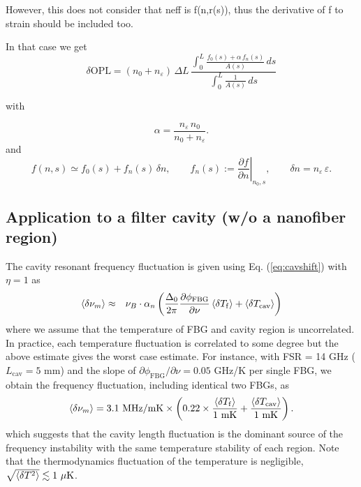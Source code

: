 \documentclass[aps,pra, onecolumn,superscriptaddress,nopacs,floatfix, showkeys, notitlepage]{revtex4-1}
\begin{document}
However, this does not consider that neff is f(n,r(s)), thus the derivative of f to strain should be included too.

In that case we get
\[
\boxed{
\delta\mathrm{OPL}
= (n_0 + n_\varepsilon)\,\Delta L\,
\frac{\displaystyle \int_0^{L}
   \frac{f_0(s) + \alpha\, f_n(s)}{A(s)}\,ds}
     {\displaystyle \int_0^{L} \frac{1}{A(s)}\,ds}
}
\]

with

\[
\alpha = \frac{n_\varepsilon\, n_0}{n_0 + n_\varepsilon}.
\]
and
\[
f(n,s) \simeq f_0(s) + f_n(s)\,\delta n,
\qquad
f_n(s) := \left.\frac{\partial f}{\partial n}\right|_{n_0,s},
\qquad
\delta n = n_\varepsilon\,\varepsilon.
\]


\subsection{Application to a filter cavity (w/o a nanofiber region)}
The cavity resonant frequency fluctuation is given using Eq. (\ref{eq:cavshift}) with $\eta=1$ as
\begin{eqnarray}    
    \braket{\delta\nu_m}&\approx& \nu_B\cdot\alpha_n\left(\frac{\Delta_0}{2\pi}\frac{\partial \phi_\mathrm{FBG}}{\partial \nu}\braket{\delta T_\mathrm{f}}+\braket{\delta T_\mathrm{cav}}\right)
\end{eqnarray}
where we assume that the temperature of FBG and cavity region is uncorrelated.
In practice, each temperature fluctuation is correlated to some degree but the above estimate gives the worst case estimate.
For instance, with FSR = 14 GHz ($L_\mathrm{cav}=5$ mm) and the slope of $\partial \phi_\mathrm{FBG}/\partial \nu=0.05$ GHz/K per single FBG, we obtain the frequency fluctuation, including identical two FBGs, as
\begin{eqnarray}
    \braket{\delta\nu_m}=3.1~\mathrm{MHz/mK}\times \left(0.22\times\frac{\braket{\delta T_\mathrm{f}}}{1~\mathrm{mK}}+\frac{\braket{\delta T_\mathrm{cav}}}{1~\mathrm{mK}}\right).
\end{eqnarray}
which suggests that the cavity length fluctuation is the dominant source of the frequency instability with the same temperature stability of each region.
Note that the thermodynamics fluctuation of the temperature is negligible, $\sqrt{\braket{\delta T^2}}\lesssim 1~\mathrm{\mu K}$.
\end{document}
